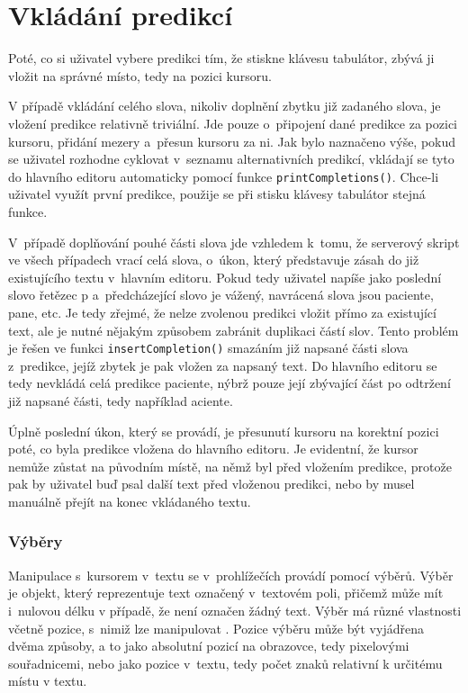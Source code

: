 \documentclass[a4paper,11pt,openany]{book} %
\newcommand\exmp{\textsf}
\begin{document}
\section{Vkládání predikcí}

Poté, co si uživatel vybere predikci tím, že stiskne klávesu tabulátor, zbývá ji vložit na správné místo, tedy na pozici kursoru.

V případě vkládání celého slova, nikoliv doplnění zbytku již zadaného slova, je vložení predikce relativně triviální. Jde pouze o~připojení dané predikce za pozici kursoru, přidání mezery a~přesun kursoru za ni. Jak bylo naznačeno výše, pokud se uživatel rozhodne cyklovat v~seznamu alternativních predikcí, vkládají se tyto do hlavního editoru automaticky pomocí funkce {\tt printCompletions()}. Chce-li uživatel využít první predikce, použije se při stisku klávesy tabulátor stejná funkce. 

V~případě doplňování pouhé části slova jde vzhledem k~tomu, že serverový skript ve všech případech vrací celá slova, o~úkon, který představuje zásah do již existujícího textu v~hlavním editoru. Pokud tedy uživatel napíše jako poslední slovo řetězec \exmp{p} a~předcházející slovo je \exmp{vážený}, navrácená slova jsou \exmp{paciente}, \exmp{pane}, etc. Je tedy zřejmé, že nelze zvolenou predikci vložit přímo za existující text, ale je nutné nějakým způsobem zabránit duplikaci částí slov. Tento problém je řešen ve funkci {\tt insertCompletion()} smazáním již napsané části slova z~predikce, jejíž zbytek je pak vložen za napsaný text. Do hlavního editoru se tedy nevkládá celá predikce \exmp{paciente}, nýbrž pouze její zbývající část po odtržení již napsané části, tedy například \exmp{aciente}.

Úplně poslední úkon, který se provádí, je přesunutí kursoru na korektní pozici poté, co byla predikce vložena do hlavního editoru. Je evidentní, že kursor nemůže zůstat na původním místě, na němž byl před vložením predikce, protože pak by uživatel buď psal další text před vloženou predikci, nebo by musel manuálně přejít na konec vkládaného textu. 

\subsubsection{Výběry}\label{vybery}

Manipulace s~kursorem v~textu se v~prohlížečích provádí pomocí výběrů. Výběr je objekt, který reprezentuje text označený v~textovém poli, přičemž může mít i~nulovou délku v případě, že není označen žádný text. Výběr má různé vlastnosti včetně pozice, s~nimiž lze manipulovat \parencite{mdn2015selections}. Pozice výběru může být vyjádřena dvěma způsoby, a to jako absolutní pozicí na obrazovce, tedy pixelovými souřadnicemi, nebo jako pozice v~textu, tedy počet znaků relativní k určitému místu v textu. %
\end{document}
